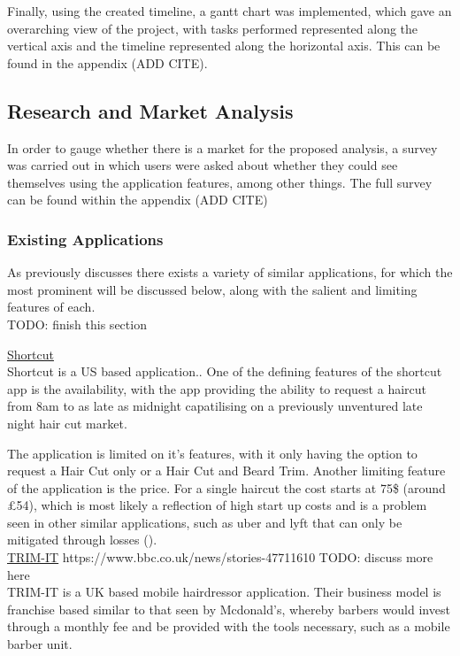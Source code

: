 \documentclass[12pt]{article}
\begin{document}
	Finally, using the created timeline, a gantt chart was implemented, which gave an overarching view of the project, with tasks performed represented along the vertical axis and the timeline represented along the horizontal axis. This can be found in the appendix (ADD CITE).
	
	\subsection{Research and Market Analysis}
	\label{market-analysis}
	In order to gauge whether there is a market for the proposed analysis, a survey was carried out in which users were asked about whether they could see themselves using the application features, among other things. The full survey can be found within the appendix (ADD CITE)
	
	\subsubsection{Existing Applications}
	As previously discusses there exists a variety of similar applications, for which the most prominent will be discussed below, along with the salient and limiting features of each.
	\\
	TODO: finish this section
	
	\noindent
	\underline{Shortcut}
	\\
	Shortcut is a US based application..
	One of the defining features of the shortcut app is the availability, with the app providing the ability to request a haircut from 8am to as late as midnight capatilising on a previously unventured late night hair cut market.
	
	The application is limited on it's features, with it only having the option to request a Hair Cut only or a Hair Cut and Beard Trim. 
	Another limiting feature of the application is the price. For a single haircut the cost starts at 75\$ (around £54), which is most likely a reflection of high start up costs and is a problem seen in other similar applications, such as uber and lyft that can only be mitigated through losses (\cite{WillRidehailingProfits}).
	\\
	
	\noindent
	\underline{TRIM-IT}
	https://www.bbc.co.uk/news/stories-47711610
	TODO: discuss more here
	\\
	TRIM-IT is a UK based mobile hairdressor application. Their business model is franchise based similar to that seen by Mcdonald's, whereby barbers would invest through a monthly fee and be provided with the tools necessary, such as a mobile barber unit. 
	
\end{document}
